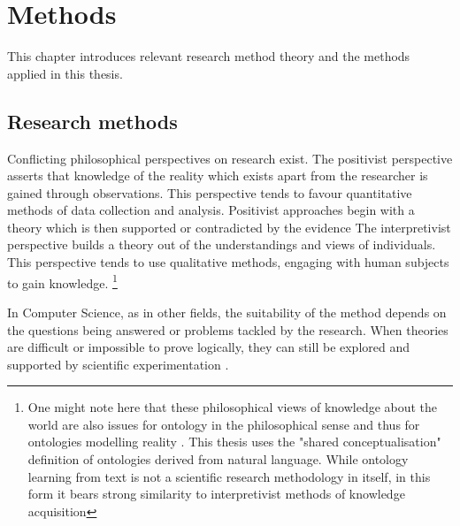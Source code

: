 \documentclass[a4paper]{report}
\newcommand{\todo}[1]{}
\begin{document}
\chapter{Methods}

This chapter introduces relevant research method theory and the methods applied in this thesis.

\section{Research methods}
\label{sec:methods:research}
Conflicting philosophical perspectives on research exist.
The positivist perspective asserts that knowledge of the reality which exists apart from the researcher is gained through observations.
This perspective tends to favour quantitative methods of data collection and analysis.
Positivist approaches begin with a theory which is then supported or contradicted by the evidence \cite[p.6-7]{creswell2003research}\todo{perhaps update to Creswell 2009}
The interpretivist perspective builds a theory out of the understandings and views of individuals.
This perspective tends to use qualitative methods, engaging with human subjects to gain knowledge.
\cite[p.7-9]{creswell2003research}
\footnote{One might note here that these philosophical views of knowledge about the world are also issues for ontology in the philosophical sense and thus for ontologies modelling reality \cite[p.6]{creswell2003research}\cite{sep-hermeneutics}.
This thesis uses the "shared conceptualisation" definition of ontologies derived from natural language.
While ontology learning from text is not a scientific research methodology in itself, in this form it bears strong similarity to interpretivist methods of knowledge acquisition}
\todo{I should probably talk about mixed methods too, since it very much exists and is probably more what I'm doing}

In Computer Science, as in other fields, the suitability  of the method depends on the questions being answered or problems tackled by the research.
When theories are difficult or impossible to prove logically, they can still be explored and supported by scientific experimentation \cite{Blomqvist09Thesis,Crnkovic2002SciMethCS}.
\todo{possibly expand on this. right now it seems like it's just dumped here out of context. expanding on experimental impl and eval in OL might help}
\end{document}
